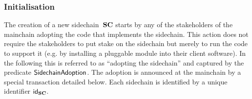 \subsubsection{Initialisation}

The creation of a new sidechain~$\mathbf{SC}$ starts by any of the stakeholders of the
mainchain adopting the code that implements the sidechain. This action does not
require the stakeholders to put stake on the sidechain but merely to run the
code to support it (e.g. by installing a pluggable module into their client
software). In the following this is referred to as ``adopting the sidechain''
and captured by the predicate $\mathsf{SidechainAdoption}$.
The adoption is  announced at the mainchain by a special transaction
detailed below.  Each sidechain is identified by a unique identifier $\mathsf{id}_{\mathbf{SC}}$.

